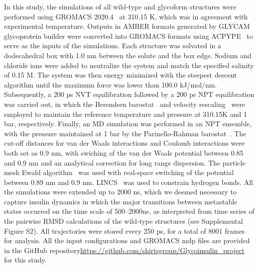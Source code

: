 \documentclass[9pt]{elife}
\begin{document}
In this study, the simulations of all wild-type and glycoform structures were performed using GROMACS 2020.4~\cite{abraham2015gromacs, pall2014tackling} at 310.15 K, which was in agreement with experimental temperature. Outputs in AMBER formats generated by GLYCAM glycoprotein builder were converted into GROMACS formats using ACPYPE~\cite{da2012acpype} to serve as the inputs of the simulations. Each structure was solvated in a dodecahedral box with 1.0 nm between the solute and the box edge. Sodium and chloride ions were added to neutralize the system and match the specified salinity of 0.15 M. The system was then energy minimized with the steepest descent algorithm until the maximum force was lower than 100.0 kJ/mol/nm. Subsequently, a 200 ps NVT equilibration followed by a 200 ps NPT equilibration was carried out, in which the Berendsen barostat~\cite{berendsen1984molecular} and velocity rescaling~\cite{bussi2007canonical} were employed to maintain the reference temperature and pressure at 310.15K and 1 bar, respectively. Finally, an MD simulation was performed in an NPT ensemble, with the pressure maintained at 1 bar by the Parinello-Rahman barostat~\cite{parrinello1980crystal, parrinello1981polymorphic}. The cut-off distances for van der Waals interactions and Coulomb interactions were both set as 0.9 nm, with swiching of the van der Waals potential between 0.85 and 0.9 nm and an analytical correction for long range dispersion. The particle mesh Ewald algorithm~\cite{essmann1995smooth} was used with real-space switching of the potential between 0.89 nm and 0.9 nm. LINCS~\cite{lincs} was used to constrain hydrogen bonds. All the simulations were extended up to 2000 ns, which we deemed necessary to capture insulin dynamics in which the major transitions between metastable states occurred on the time scale of 500--2000ns, as interpreted from time series of the pairwise RMSD calculations of the wild-type structures (see Supplemental Figure S2). All trajectories were stored every 250 ps, for a total of 8001 frames for analysis. All the input configurations and GROMACS mdp files are provided in the GitHub repository\href{https://github.com/shirtsgroup/Glycoinsulin_project}{https://github.com/shirtsgroup/Glycoinsulin\_project} for this study.
\end{document}
